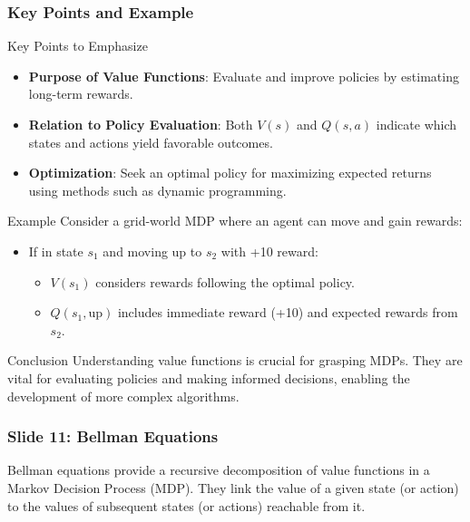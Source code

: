 \documentclass[aspectratio=169]{beamer}
\begin{document}
\begin{frame}[fragile]
    \frametitle{Key Points and Example}
    \begin{block}{Key Points to Emphasize}
        \begin{itemize}
            \item \textbf{Purpose of Value Functions}: Evaluate and improve policies by estimating long-term rewards.
            \item \textbf{Relation to Policy Evaluation}: Both \( V(s) \) and \( Q(s, a) \) indicate which states and actions yield favorable outcomes.
            \item \textbf{Optimization}: Seek an optimal policy for maximizing expected returns using methods such as dynamic programming.
        \end{itemize}
    \end{block}

    \begin{block}{Example}
        Consider a grid-world MDP where an agent can move and gain rewards:
        \begin{itemize}
            \item If in state \( s_1 \) and moving up to \( s_2 \) with +10 reward:
            \begin{itemize}
                \item \( V(s_1) \) considers rewards following the optimal policy.
                \item \( Q(s_1, \text{up}) \) includes immediate reward (+10) and expected rewards from \( s_2 \).
            \end{itemize}
        \end{itemize}
    \end{block}

    \begin{block}{Conclusion}
        Understanding value functions is crucial for grasping MDPs. They are vital for evaluating policies and making informed decisions, enabling the development of more complex algorithms.
    \end{block}
\end{frame}

\begin{frame}[fragile]
    \frametitle{Slide 11: Bellman Equations}
    Bellman equations provide a recursive decomposition of value functions in a Markov Decision Process (MDP). They link the value of a given state (or action) to the values of subsequent states (or actions) reachable from it.
\end{frame}
\end{document}
